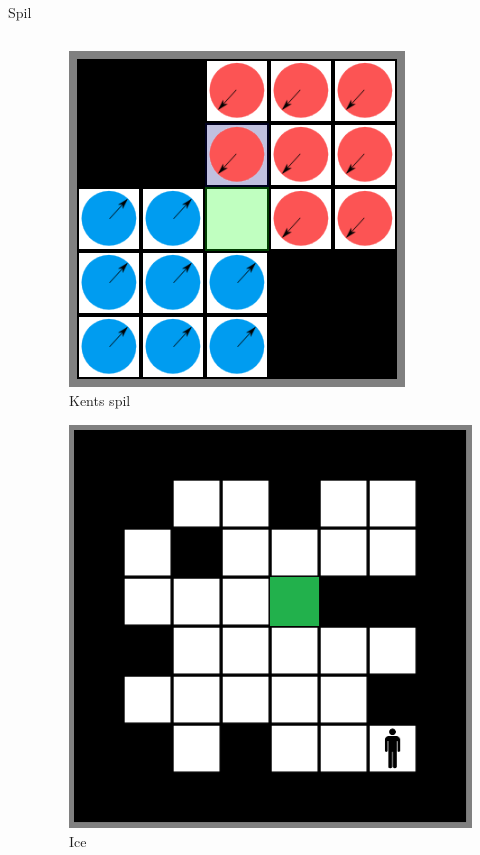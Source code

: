 \begin{frame}{Spil}
\begin{columns}
\begin{column}{.49\textwidth}
	\end{column}
	\hfill
	\begin{column}{.49\textwidth}
		\begin{figure}[H]
   			\includegraphics[scale=0.23]{billeder/kentspil.png}
   			\caption{Kents spil}
		\end{figure}
		\begin{figure}[H]
   			\includegraphics[scale=0.18]{billeder/ice.png}
   			\caption{Ice}
		\end{figure}
	\end{column}
\end{columns}
\end{frame}


